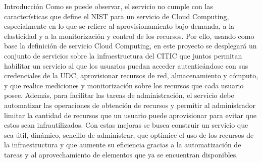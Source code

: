 \begin{chapter}{Introducción}
Como se puede observar, el servicio no cumple con las características que define el NIST para un servicio de Cloud Computing, especialmente en lo que se refiere al aprovisionamiento bajo demanda, a la elasticidad y a la monitorización y control de los recursos. Por ello, usando como base la definición de servicio Cloud Computing, en este proyecto se desplegará un conjunto de servicios sobre la infraestructura del CITIC que juntos permitan habilitar un servicio al que los usuarios puedan acceder autenticándose con sus credenciales de la UDC, aprovisionar recursos de red, almacenamiento y cómputo, y que realice mediciones y monitorización sobre los recursos que cada usuario posee. Además, para facilitar las tareas de administración, el servicio debe automatizar las operaciones de obtención de recursos y permitir al administrador limitar la cantidad de recursos que un usuario puede aprovisionar para evitar que estos sean infrautilizados.
Con estas mejoras se busca construir un servicio que sea útil, dinámico, sencillo de administrar, que optimice el uso de los recursos de la infraestructura y que aumente su eficiencia gracias a la automatización de tareas y al aprovechamiento de elementos que ya se encuentran disponibles.





\end{chapter}
